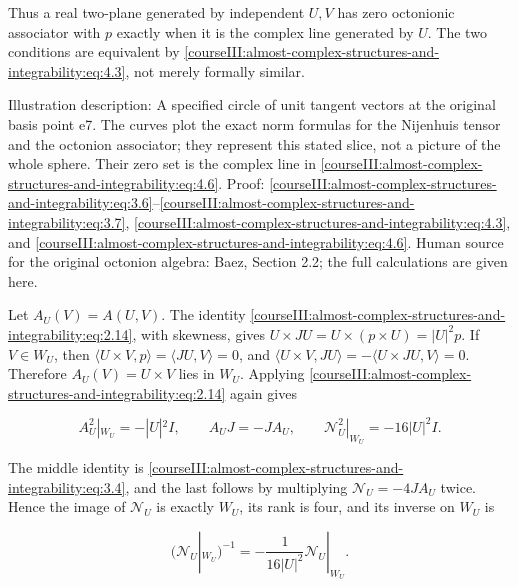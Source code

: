 Thus a real two-plane generated by independent \(U,V\) has zero octonionic associator with \(p\) exactly when it is the complex line generated by \(U\). The two conditions are equivalent by \eqref{courseIII:almost-complex-structures-and-integrability:eq:4.3}, not merely formally similar.

\label{courseIII:almost-complex-structures-and-integrability:octonion-circle-figure-style-min-width:900px-max-width:none-width:900px}
Illustration description: A specified circle of unit tangent vectors at the original basis point e7. The curves plot the exact norm formulas for the Nijenhuis tensor and the octonion associator; they represent this stated slice, not a picture of the whole sphere. Their zero set is the complex line in \eqref{courseIII:almost-complex-structures-and-integrability:eq:4.6}. Proof: \eqref{courseIII:almost-complex-structures-and-integrability:eq:3.6}--\eqref{courseIII:almost-complex-structures-and-integrability:eq:3.7}, \eqref{courseIII:almost-complex-structures-and-integrability:eq:4.3}, and \eqref{courseIII:almost-complex-structures-and-integrability:eq:4.6}. Human source for the original octonion algebra: Baez, Section 2.2; the full calculations are given here.

Let \(A_U(V)=A(U,V)\). The identity \eqref{courseIII:almost-complex-structures-and-integrability:eq:2.14}, with skewness, gives
\(U\times JU=U\times(p\times U)=|U|^2p\).
If \(V\in W_U\), then \(\langle U\times V,p\rangle=\langle JU,V\rangle=0\), and
\(\langle U\times V,JU\rangle=-\langle U\times JU,V\rangle=0\).
Therefore \(A_U(V)=U\times V\) lies in \(W_U\). Applying \eqref{courseIII:almost-complex-structures-and-integrability:eq:2.14} again gives

\begin{equation}
A_U^2|_{W_U}=-|U|^2I,
\qquad A_UJ=-JA_U,
\qquad \mathcal N_U^2|_{W_U}=-16|U|^2I.
\label{courseIII:almost-complex-structures-and-integrability:eq:4.7}
\end{equation}

The middle identity is \eqref{courseIII:almost-complex-structures-and-integrability:eq:3.4}, and the last follows by multiplying \(\mathcal N_U=-4JA_U\) twice. Hence the image of \(\mathcal N_U\) is exactly \(W_U\), its rank is four, and its inverse on \(W_U\) is

\begin{equation}
(\mathcal N_U|_{W_U})^{-1}
=-\frac{1}{16|U|^2}\mathcal N_U|_{W_U}.
\label{courseIII:almost-complex-structures-and-integrability:eq:4.8}
\end{equation}

